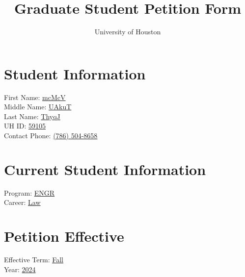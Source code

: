 \documentclass[a4paper,12pt]{article}
\title{Graduate Student Petition Form}
\author{University of Houston}
\date{}
\begin{document}
\maketitle

\section*{Student Information}
\begin{tabbing}
First Name: \hspace{3cm} \= \underline{\hspace{5cm} mcMcV} \\
Middle Name: \> \underline{\hspace{5cm} UAkuT} \\
Last Name: \> \underline{\hspace{5cm} ThyqJ} \\
UH ID: \> \underline{\hspace{5cm} 59105} \\
Contact Phone: \> \underline{\hspace{5cm} (786) 504-8658} \\
\end{tabbing}

\section*{Current Student Information}
\begin{tabbing}
Program: \hspace{3cm} \= \underline{\hspace{5cm} ENGR} \\
Career: \> \underline{\hspace{5cm} Law} \\
\end{tabbing}

\section*{Petition Effective}
\begin{tabbing}
Effective Term: \hspace{2cm} \= \underline{\hspace{5cm} Fall} \\
Year: \> \underline{\hspace{5cm} 2024} \\
\end{tabbing}
\end{document}
